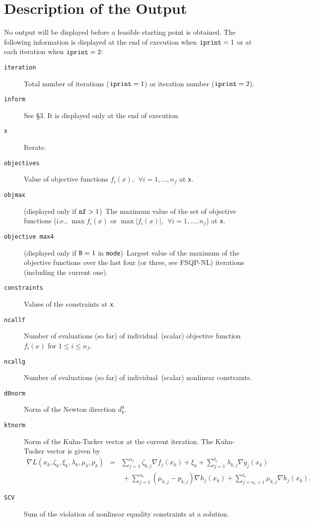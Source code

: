 \section{Description of the Output}
No output will be displayed before a feasible starting 
point is obtained. The following information is displayed 
at the end of execution when 
${\tt iprint} = 1$ or at each iteration when ${\tt iprint}=2$:
\begin{description}
\item[\tt iteration]  Total number of iterations (${\tt iprint}=1$) or
                   iteration number (${\tt iprint}=2$).
\item[\tt inform]  See \S 3. It is displayed only
                   at the end of execution.
\item[\tt x]       Iterate.
\item[\tt objectives]  Value of objective functions $f_i(x),~~\forall 
                    i=1,\ldots,n_f$ at {\tt x}. 
\item[\tt objmax]  (displayed only if $\mbox{\tt nf} > 1$)~The 
                   maximum value of the set of objective 
        functions (i.e., $\max f_i(x) \mbox{ or } \max |f_i(x)|,~~
        \forall i=1,\ldots,n_f$) at {\tt x}.
\item[\tt objective max4]  (displayed only if $\mbox{\tt B} = 1$ 
                   in {\tt mode})~Largest value of
                   the maximum of the objective functions over the 
                   last four (or three, see FSQP-NL) 
                   iterations (including the current one).
\item[\tt constraints] Values of the constraints at {\tt x}.
\item[\tt ncallf]  Number of evaluations (so far) of 
                   individual~(scalar) objective function $f_i(x)$ 
                   for $1\leq i \leq n_f.$
\item[\tt ncallg]  Number of evaluations (so far) of 
                   individual~(scalar) nonlinear constraints.
\item[\tt d0norm]  Norm of the Newton direction $d_k^0$.
\item[\tt ktnorm]  Norm of the Kuhn-Tucker vector at the current 
                   iteration. The Kuhn-Tucker vector is given by
$$\begin{array}{lll}
\nabla L(x_k,\zeta_k,\xi_k,\lambda_k,\mu_k,p_k)& = &
\sum\limits_{j=1}^{n_f} \zeta _{k,j}\nabla f_j(x_k)+
\xi_k+\sum\limits_{j=1}^{t_i}\lambda _{k,j}\nabla g_j(x_k) \\
& &~+\sum\limits_{j=1}^{n_e}(\mu_{k,j}-p_{k,j})\nabla h_j(x_k)
    +\sum\limits_{j=n_e+1}^{t_e}\mu_{k,j}\nabla h_j(x_k).\end{array}$$
\item[\tt SCV]     Sum of the violation of nonlinear equality constraints
at a solution.
\end{description}


